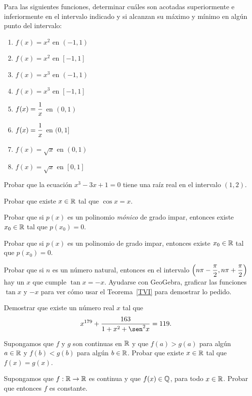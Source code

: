 \item Para las siguientes funciones, determinar cuáles son acotadas superiormente e inferiormente en el intervalo indicado y si alcanzan su máximo y mínimo en algún punto del intervalo:

\begin{multicols}{2}
\begin{enumerate}
    \item $f(x)= x^2$ en $(-1,1)$
    \item $f(x)= x^2$ en $[-1,1]$
    \item $f(x)= x^3$ en $(-1,1)$
    \item $f(x)= x^3$ en $[-1,1]$
    \item $\displaystyle f(x)= \frac1x$ en $(0,1)$
    \item $\displaystyle f(x)= \frac1x$ en $(0,1]$
    \item $f(x)= \sqrt{x}$ en $(0,1)$
    \item $f(x)= \sqrt{x}$ en $[0,1]$
\end{enumerate}   
\end{multicols}



\item Probar que la ecuación $x^3-3x+1=0$ tiene una raíz real en el intervalo $(1,2)$.

\item Probar que existe $x\in\mathbb{R}$ tal que $\cos x=x$.

\item Probar que si $p(x)$ es un polinomio \emph{mónico} de grado impar, entonces existe $x_0\in\mathbb{R}$ tal que $p(x_0)=0$.

\item Probar que si $p(x)$ es un polinomio de grado impar, entonces existe $x_0\in\mathbb{R}$ tal que $p(x_0)=0$.

\item Probar que si $n$ es un número natural, entonces en el intervalo $\displaystyle\Big(n\pi-\frac\pi2,n\pi+\frac\pi2\Big)$ hay un $x$ que cumple $\tan x=-x$. Ayudarse con GeoGebra, graficar las funciones $\tan x$ y $-x$ para ver cómo usar el Teorema~\ref{TVI} para demostrar lo pedido.

\item Demostrar que existe un número real $x$ tal que
\[
x^{179} + \frac{163}{1+x^2+\sen^2 x} = 119.
\]

\item Supongamos que $f$ y $g$ son continuas en $\mathbb{R}$ y que $f(a)>g(a)$ para algún $a\in\mathbb{R}$ y $f(b)<g(b)$ para algún $b\in\mathbb{R}$. Probar que existe $x\in\mathbb{R}$ tal que $f(x)=g(x)$.

\item Supongamos que $f:\mathbb{R}\to\mathbb{R}$ es continua y que $f(x)\in\mathbb{Q}$, para todo $x\in\mathbb{R}$. Probar que entonces $f$ es constante.
